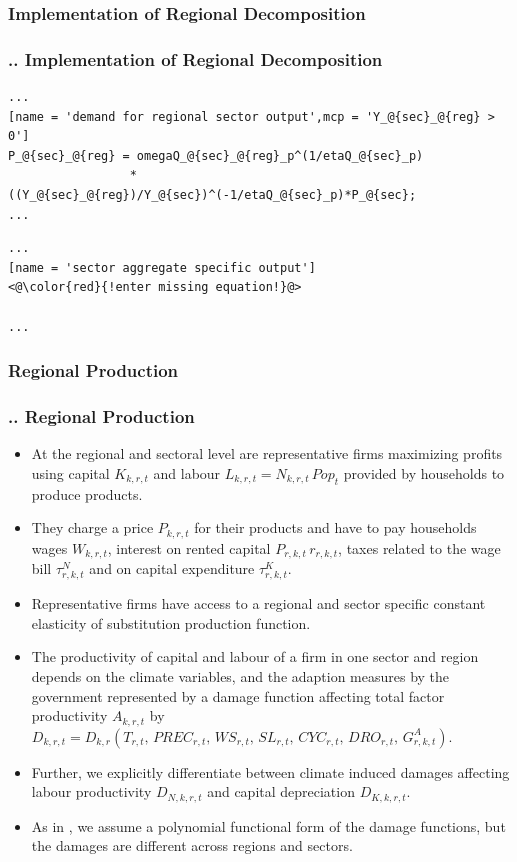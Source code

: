\documentclass[11pt,aspectratio=169]{beamer}
\begin{document}
\subsubsection{Implementation of Regional Decomposition}
\begin{frame}[fragile]
\frametitle{{\thesection.\thesubsection.\thesubsubsection} Implementation of Regional Decomposition}

\begin{lstlisting}[frame = single]
...
[name = 'demand for regional sector output',mcp = 'Y_@{sec}_@{reg} > 0']
P_@{sec}_@{reg} = omegaQ_@{sec}_@{reg}_p^(1/etaQ_@{sec}_p)
                 *((Y_@{sec}_@{reg})/Y_@{sec})^(-1/etaQ_@{sec}_p)*P_@{sec};
...
\end{lstlisting}

\begin{lstlisting}[frame = single]
...
[name = 'sector aggregate specific output']
<@\color{red}{!enter missing equation!}@>

...
\end{lstlisting}
\end{frame}

\subsubsection{Regional Production}
\begin{frame}
\frametitle{{\thesection.\thesubsection.\thesubsubsection} Regional Production}
\scriptsize
\begin{itemize}
\item At the regional and sectoral level are representative firms maximizing profits using capital $K_{k,r,t}$ and labour $L_{k,r,t} = N_{k,r,t} \, Pop_{t}$ provided by households to produce products. 
\item They charge a price $P_{k,r,t}$ for their products and have to pay households wages $W_{k,r,t}$, interest on rented capital $P_{r,k,t} \, r_{r,k,t}$, taxes related to the wage bill $\tau^{N}_{r,k,t}$ and on capital expenditure $\tau^{K}_{r,k,t}$.
\item Representative firms have access to a regional and sector specific constant elasticity of substitution production function.
\item The productivity of capital and labour of a firm in one sector and region depends on the climate variables, and the adaption measures by the government represented by a damage function affecting total factor productivity $A_{k,r,t}$ by $D_{k,r,t} = D_{k,r}\left(T_{r,t}, \, PREC_{r,t}, \, WS_{r,t}, \, SL_{r,t}, \, CYC_{r,t}, \, DRO_{r,t}, \, G^{A}_{r,k,t} \right)$.
\item Further, we explicitly differentiate between climate induced damages affecting labour productivity $D_{N,k,r,t}$ and capital depreciation $D_{K,k,r,t}$. 
\item As in \cite{nordhaus1993optimal}, we assume a polynomial functional form of the damage functions, but the damages are different across regions and sectors.
\end{itemize}
\end{frame}
\end{document}
